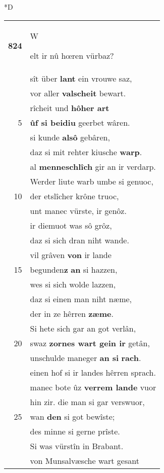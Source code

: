 \documentclass[8pt,a4paper,notitlepage]{article}
\begin{document}
\begin{table}[ht]
\begin{minipage}[t]{0.5\linewidth}
\small
\begin{center}*D
\end{center}
\begin{tabular}{rl}
\textbf{824} & \begin{large}W\end{large}elt ir nû hœren vürbaz?\\ 
 & sît über \textbf{lant} ein vrouwe saz,\\ 
 & vor aller \textbf{valscheit} bewart.\\ 
 & rîcheit und \textbf{hôher art}\\ 
5 & \textbf{ûf si beidiu} geerbet wâren.\\ 
 & si kunde \textbf{alsô} gebâren,\\ 
 & daz si mit rehter kiusche \textbf{warp}.\\ 
 & al \textbf{menneschlîch} gir an ir verdarp.\\ 
 & Werder liute warb umbe si genuoc,\\ 
10 & der etslîcher krône truoc,\\ 
 & unt manec vürste, ir genôz.\\ 
 & ir diemuot was sô grôz,\\ 
 & daz si sich dran niht wande.\\ 
 & vil grâven \textbf{von} ir lande\\ 
15 & begunden\textbf{z} \textbf{an} si hazzen,\\ 
 & wes si sich wolde lazzen,\\ 
 & daz si einen man niht næme,\\ 
 & der in ze hêrren \textbf{zæme}.\\ 
 & Si hete sich gar an got verlân,\\ 
20 & swaz \textbf{zornes wart gein ir} getân,\\ 
 & unschulde maneger \textbf{an si} \textbf{rach}.\\ 
 & einen hof si ir landes hêrren sprach.\\ 
 & manec bote ûz \textbf{verrem lande} vuor\\ 
 & hin zir. die man si gar verswuor,\\ 
25 & wan \textbf{den} si got bewîste;\\ 
 & des minne si gerne prîste.\\ 
 & Si was vürstîn in Brabant.\\ 
 & von Munsalvæsche wart gesant\\ 

\end{tabular}
\end{minipage}
\end{table}
\end{document}

